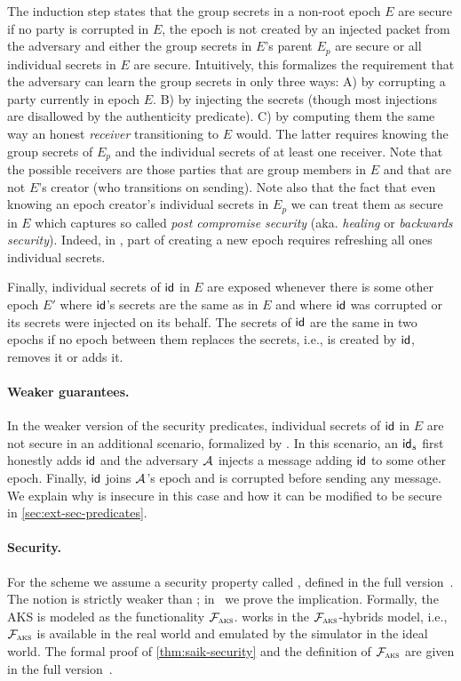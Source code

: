 The induction step states that the group secrets in a non-root epoch $E$
are secure if no party is corrupted in $E$, the epoch is not created
by an injected packet from the adversary and either the group secrets in
$E$'s parent $E_p$ are secure or all individual secrets in
$E$ are secure. Intuitively, this formalizes the requirement that the
adversary can learn the group secrets in only three ways: A) by corrupting a
party currently in epoch $E$. B) by injecting the secrets (though
most injections are disallowed by the authenticity predicate). C) by
computing them the same way an honest \emph{receiver} transitioning to
$E$ would. The latter requires knowing the group secrets of
$E_p$ and the individual secrets of at least one receiver. Note that
the possible receivers are those parties that are group members in
$E$ and that are not $E$'s creator (who transitions on
sending). Note also that the fact that even knowing an epoch creator's individual
secrets in $E_p$ we can treat them as secure in $E$ which captures
so called \emph{post compromise security} (aka. \emph{healing} or
\emph{backwards security}). Indeed, in \saik, part of creating a new epoch
requires refreshing all ones individual secrets.

Finally, individual secrets of ${\mathsf{id}}$ in $E$ are exposed whenever
there is some other epoch $E'$ where ${\mathsf{id}}$'s secrets are the same as
in $E$ and where ${\mathsf{id}}$ was corrupted or its secrets were injected on
its behalf. The secrets of ${\mathsf{id}}$ are the same in two epochs if no epoch between them replaces the secrets, i.e., is created by ${\mathsf{id}}$, removes
it or adds it.

\paragraph{Weaker guarantees.}
In the weaker version of the security predicates, individual secrets of ${\mathsf{id}}$
in $E$ are not secure in an additional scenario, formalized by
\safeWeakAdd. In this scenario, an ${\mathsf{id}}_s$ first honestly adds ${\mathsf{id}}$ and the
adversary $\mathcal{A}_{\relax}$ injects a message adding ${\mathsf{id}}$ to some other epoch. Finally,
${\mathsf{id}}$ joins $\mathcal{A}_{\relax}$'s epoch and is corrupted before sending any message. We explain why \saik is insecure in this case and how it can be modified to be secure in
\cref{sec:ext-sec-predicates}.

\paragraph{Security.} 
For the \mmPKE scheme we assume a security property called \mmowrcca, defined in the full version~\cite{EPRINT:AHKM21}. The notion is strictly weaker than \mmindcca; in~\cite{EPRINT:AHKM21} we prove the implication.
%
Formally, the AKS is modeled as the functionality $\mathcal{F}_{\normalfont\textsc{aks}}$. \saik
works in the $\mathcal{F}_{\normalfont\textsc{aks}}$-hybrids model, i.e., $\mathcal{F}_{\normalfont\textsc{aks}}$ is available in the real world and emulated by the simulator in the ideal world.
The formal proof of \cref{thm:saik-security} and the definition of $\mathcal{F}_{\normalfont\textsc{aks}}$ are given in the full version~\cite{EPRINT:AHKM21}.

